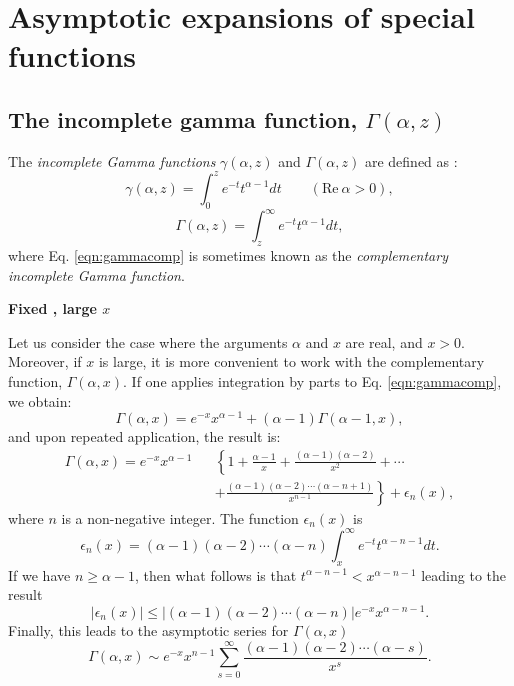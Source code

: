 \chapter{Asymptotic expansions of special functions }
\label{app:specfunc}

\section{The incomplete gamma function, $\Gamma(\alpha,z)$}

The \textit{incomplete Gamma functions} $\gamma(\alpha,z)$ and $\Gamma(\alpha,z)$ are defined as \cite{RN779}:
\begin{equation}
\gamma(\alpha,z)=\int^z_0 e^{-t}t^{\alpha-1}dt \qquad (\text{Re}~\alpha >0),
\label{eqn:gamma}
\end{equation}
\begin{equation}
\Gamma(\alpha,z)=\int^{\infty}_z e^{-t}t^{\alpha-1}dt,
\label{eqn:gammacomp}
\end{equation}
where Eq. \ref{eqn:gammacomp} is sometimes known as the \textit{complementary incomplete Gamma function}. 

\noindent\textbf{Fixed \alpha, large $x$}

\noindent
Let us consider the case where the arguments $\alpha$ and $x$ are real, and $x>0$. Moreover, if $x$ is large, it is more convenient to work with the complementary function, $\Gamma(\alpha,x)$. If one applies integration by parts to Eq. \ref{eqn:gammacomp}, we obtain:
\begin{equation}
\Gamma(\alpha,x)=e^{-x}x^{\alpha-1}+(\alpha-1)\Gamma(\alpha-1,x),
\end{equation}
and upon repeated application, the result is:
\begin{eqnarray}
\Gamma(\alpha,x)=e^{-x}x^{\alpha-1} &&\left\{1+\frac{\alpha-1}{x}+\frac{(\alpha-1)(\alpha-2)}{x^2}+\cdots \right. \\
&& \left. +\frac{(\alpha-1)(\alpha-2)\cdots(\alpha-n+1)}{x^{n-1}} \right\}+\epsilon_{n}(x),
\end{eqnarray}
where $n$ is a non-negative integer. The function $\epsilon_{n}(x)$ is
\begin{equation}
\epsilon_n (x)=(\alpha-1)(\alpha-2)\cdots(\alpha-n)\int^{\infty}_x e^{-t}t^{\alpha-n-1}dt.
\end{equation}
If we have $n \geq \alpha-1$, then what follows is that $t^{\alpha-n-1}<x^{\alpha-n-1}$ leading to the result
\begin{equation}
|\epsilon_n (x)| \leq |(\alpha-1)(\alpha-2)\cdots(\alpha-n)|e^{-x}x^{\alpha-n-1}.
\end{equation}
Finally, this leads to the asymptotic series for $\Gamma(\alpha,x)$
\begin{equation}
\Gamma(\alpha,x) \sim e^{-x}x^{n-1} \sum^{\infty}_{s=0} \frac{(\alpha-1)(\alpha-2)\cdots(\alpha-s)}{x^s}.
\end{equation}

